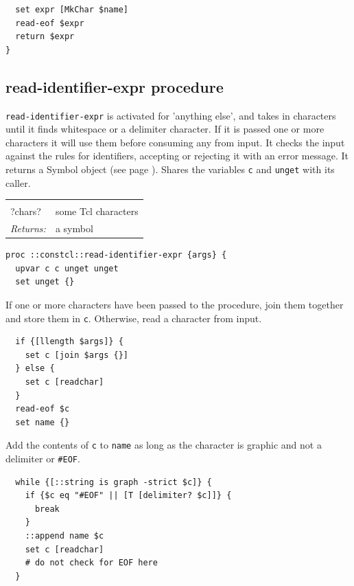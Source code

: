 \documentclass[twoside]{report}
\begin{document}
\begin{lstlisting}
  set expr [MkChar $name]
  read-eof $expr
  return $expr
}
\end{lstlisting}

\subsection{read-identifier-expr procedure}
\label{readidentifierexpr-procedure}

\texttt{read-identifier-expr} is activated for 'anything else', and takes in characters until it finds whitespace or a delimiter character. If it is passed one or more characters it will use them before consuming any from input. It checks the input against the rules for identifiers, accepting or rejecting it with an error message. It returns a Symbol object (see page \pageref{symbols}). Shares the variables \texttt{c} and \texttt{unget} with its caller.

\noindent\begin{tabular}{ |p{1.9cm} p{8cm}| }
\hline
\rowcolor[HTML]{CCCCCC} \multicolumn{2}{|l|}{\bf read-identifier-expr (internal)} \\
?chars? & some Tcl characters \\
\textit{Returns:} & a symbol \\
\hline
\end{tabular}

\begin{lstlisting}
proc ::constcl::read-identifier-expr {args} {
  upvar c c unget unget
  set unget {}
\end{lstlisting}

If one or more characters have been passed to the procedure, join them together and store them in \texttt{c}. Otherwise, read a character from input.

\begin{lstlisting}
  if {[llength $args]} {
    set c [join $args {}]
  } else {
    set c [readchar]
  }
  read-eof $c
  set name {}
\end{lstlisting}

Add the contents of \texttt{c} to \texttt{name} as long as the character is graphic and not a delimiter or \texttt{\#EOF}.

\begin{lstlisting}
  while {[::string is graph -strict $c]} {
    if {$c eq "#EOF" || [T [delimiter? $c]]} {
      break
    }
    ::append name $c
    set c [readchar]
    # do not check for EOF here
  }
\end{lstlisting}
\end{document}
